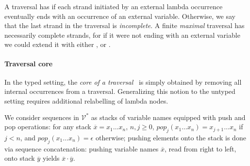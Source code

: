 \documentclass{elsarticle}
\theoremstyle{plain}
\theoremstyle{definition}
\newcommand\VarSet{\mathcal{V}}
\begin{document}
A traversal has 
if each strand initiated by an external lambda occurrence
eventually ends with an occurrence of an external variable.
Otherwise, we say that the last strand in the traversal is \emph{incomplete}.
%
A finite \emph{maximal} traversal has necessarily complete strands, for if it were not ending with an external variable we could extend it with either ,  or .
%

\paragraph{Traversal core}

In the typed setting, the \emph{core of a traversal}~\cite{BlumPhd} is simply obtained by removing all internal occurrences from a traversal.
Generalizing this notion to the untyped setting requires
additional relabelling of lambda nodes.

We consider sequences in $\VarSet^*$ as stacks of variable names equipped with  push and pop operations: for any stack $\overline{x} = x_1 \ldots x_n$, $n,j\geq0$, $pop_j (x_1 \ldots x_n) = x_{j+1} \ldots x_n$ if $j<n$, and $pop_j (x_1 \ldots x_n) = \epsilon$ otherwise;
pushing elements onto the stack is done via sequence concatenation:
 pushing  variable names $\overline{x}$, read from right to left, onto stack $\overline{y}$ yields  $\overline{x} \cdot \overline{y}$.
\end{document}
